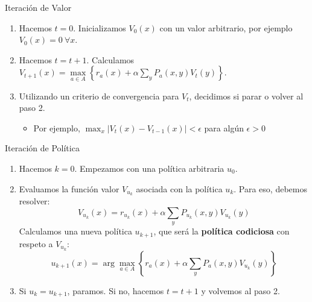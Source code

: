 \documentclass[handout]{beamer}
\begin{document}
\begin{frame}{Iteración de Valor}
\begin{enumerate}
\item Hacemos $t = 0$. Inicializamos $V_0(x)$ con un valor arbitrario, por ejemplo $V_0(x) = 0~\forall x$.
\item Hacemos $t = t+1$. Calculamos 
$V_{t+1}(x) =  \max\limits_{a \in A} \left\{r_a(x)+\alpha \sum_y P_a(x,y) V_t(y)\right\}$.
\item Utilizando un criterio de convergencia para $V_t$, decidimos si parar o volver al paso 2.
\begin{itemize}
\item<4-> Por ejemplo, $\max_x |V_t(x)-V_{t-1}(x)|<\epsilon$ para algún $\epsilon>0$
\end{itemize}
\end{enumerate}
\end{frame}

\begin{frame}{Iteración de Política}
\begin{enumerate}
\item Hacemos $k = 0$. Empezamos con una política arbitraria $u_0$.

\item Evaluamos la función valor $V_{u_k}$ asociada con la política $u_k$. Para eso, debemos resolver:
$$
V_{u_k}(x) = r_{u_k}(x) + \alpha \sum _y P_{u_k}(x,y)V_{u_k}(y)
$$
Calculamos una nueva política $u_{k+1}$, que será la \textbf{política codiciosa} con respeto a $V_{u_k}$:
$$
u_{k+1}(x) = \arg\max_{a \in A} \left\{r_a(x) + \alpha\sum_y P_a(x,y)V_{u_k}(y)\right\}
$$
\item Si $u_k=u_{k+1}$, paramos. Si no, hacemos $t = t+1$ y volvemos al paso 2.
\end{enumerate}
\end{frame}
\end{document}
